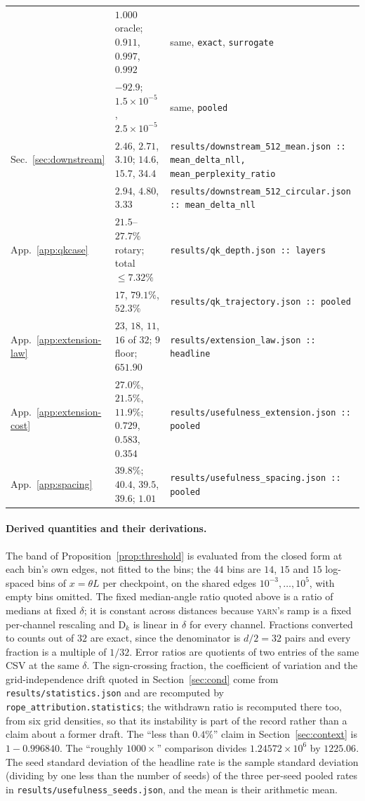 \documentclass{article}
\theoremstyle{plain}
\theoremstyle{remark}
\newcommand{\yarn}{\textsc{yarn}}
\newcommand{\D}{\mathrm{D}_k}
\newcommand{\half}{d/2}
\begin{document}
\begin{table}[t]
\begin{tabular}{lll}
 & $1.000$ oracle; $0.911$, $0.997$, $0.992$ & same, \texttt{exact}, \texttt{surrogate} \\
 & $-92.9$; $1.5\!\times\!10^{-5}$, $2.5\!\times\!10^{-5}$ & same, \texttt{pooled} \\
Sec.~\ref{sec:downstream} & $2.46$, $2.71$, $3.10$; $14.6$, $15.7$, $34.4$ & \texttt{results/downstream\_512\_mean.json :: mean\_delta\_nll, mean\_perplexity\_ratio} \\
 & $2.94$, $4.80$, $3.33$ & \texttt{results/downstream\_512\_circular.json :: mean\_delta\_nll} \\
App.~\ref{app:qkcase} & $21.5$--$27.7\%$ rotary; total $\le 7.32\%$ & \texttt{results/qk\_depth.json :: layers} \\
 & $17$, $79.1\%$, $52.3\%$ & \texttt{results/qk\_trajectory.json :: pooled} \\
App.~\ref{app:extension-law} & $23$, $18$, $11$, $16$ of $32$; $9$ floor; $651.90$ & \texttt{results/extension\_law.json :: headline} \\
App.~\ref{app:extension-cost} & $27.0\%$, $21.5\%$, $11.9\%$; $0.729$, $0.583$, $0.354$ & \texttt{results/usefulness\_extension.json :: pooled} \\
App.~\ref{app:spacing} & $39.8\%$; $40.4$, $39.5$, $39.6$; $1.01$ & \texttt{results/usefulness\_spacing.json :: pooled} \\
\bottomrule
\end{tabular}
\end{table}

\paragraph{Derived quantities and their derivations.} The band of
Proposition~\ref{prop:threshold} is evaluated from the closed form at each bin's
own edges, not fitted to the bins; the $44$ bins are $14$, $15$ and $15$
log-spaced bins of $x=\theta L$ per checkpoint, on the shared edges
$10^{-3},\dots,10^{5}$, with empty bins omitted. The fixed median-angle
ratio quoted above is a ratio of medians at fixed $\delta$; it is constant across
distances because \yarn's ramp is a fixed per-channel rescaling and $\D$ is
linear in $\delta$ for every channel. Fractions converted to counts out of $32$
are exact, since the denominator is $\half = 32$ pairs and every fraction is a
multiple of $1/32$. Error ratios are quotients of two entries of the same CSV at
the same $\delta$. The sign-crossing fraction, the coefficient of variation and
the grid-independence drift quoted in Section~\ref{sec:cond} come from
\texttt{results/statistics.json} and are recomputed by
\texttt{rope\_attribution.statistics}; the withdrawn ratio is recomputed there
too, from six grid densities, so that its instability is part of the record
rather than a claim about a former draft. The ``less
than $0.4\%$'' claim in Section~\ref{sec:context} is $1 - 0.996840$. The
``roughly $1000\times$'' comparison divides
$1.24572\times10^{6}$ by $1225.06$. The seed standard deviation of the
headline rate is the sample standard deviation (dividing by one less than
the number of seeds) of the three per-seed pooled rates in
\texttt{results/usefulness\_seeds.json}, and the mean is their arithmetic
mean.
\end{document}
